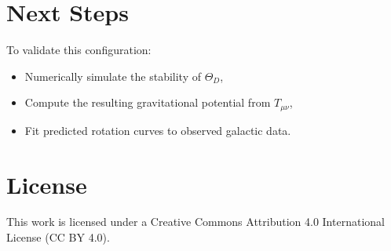 \documentclass[12pt]{article}
\begin{document}
\section{Next Steps}
To validate this configuration:
\begin{itemize}
    \item Numerically simulate the stability of \(\Theta_D\),
    \item Compute the resulting gravitational potential from \(T_{\mu\nu}\),
    \item Fit predicted rotation curves to observed galactic data.
\end{itemize}


\section*{License}
This work is licensed under a Creative Commons Attribution 4.0 International License (CC BY 4.0).
\end{document}

